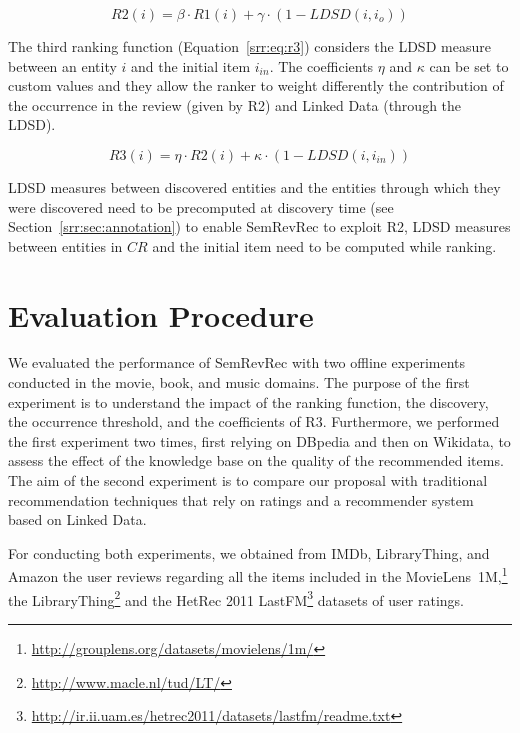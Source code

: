 \begin{equation}
\label{srr:eq:r2}
\mathit{R2}(i) = \beta \cdot \mathit{R1}(i) + \gamma \cdot (1 - \mathit{LDSD}(i, i_o))
\end{equation}

The third ranking function (Equation~\ref{srr:eq:r3}) considers the LDSD measure between an entity $i$ and the initial item $i_{in}$. The coefficients $\eta$ and $\kappa$ can be set to custom values and they allow the ranker to weight differently the contribution of the occurrence in the review (given by R2) and Linked Data (through the LDSD).

\begin{equation}
\label{srr:eq:r3}
\mathit{R3}(i) = \eta \cdot \mathit{R2}(i) + \kappa \cdot (1- \mathit{LDSD}(i, i_{in}))
\end{equation}

LDSD measures between discovered entities and the entities through which they were discovered need to be precomputed at discovery time (see Section~\ref{srr:sec:annotation}) to enable SemRevRec to exploit R2, LDSD measures between entities in $CR$ and the initial item need to be computed while ranking.%

\section{Evaluation Procedure}
\label{srr:sec:eval}

We evaluated the performance of SemRevRec with two offline experiments conducted in the movie, book, and music domains. The purpose of the first experiment is to understand the impact of the ranking function, the discovery, the occurrence threshold, and the coefficients of R3. Furthermore, we performed the first experiment two times, first relying on DBpedia and then on Wikidata, to assess the effect of the knowledge base on the quality of the recommended items. The aim of the second experiment is to compare our proposal with traditional recommendation techniques that rely on ratings and a recommender system based on Linked Data.

For conducting both experiments, we obtained from IMDb, LibraryThing, and Amazon the user reviews regarding all the items included in the MovieLens~1M,\footnote{\url{http://grouplens.org/datasets/movielens/1m/}} the LibraryThing\footnote{\url{http://www.macle.nl/tud/LT/}} and the HetRec 2011 LastFM\footnote{\url{http://ir.ii.uam.es/hetrec2011/datasets/lastfm/readme.txt}} datasets of user ratings.

